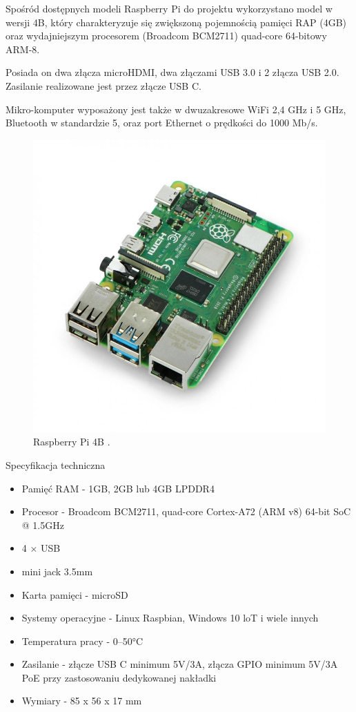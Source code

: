 \documentclass[a4paper,12pt,reqno]{article}
\begin{document}
Spośród dostępnych modeli Raspberry Pi do projektu wykorzystano model w wersji 4B, który charakteryzuje się zwiększoną pojemnością pamięci RAP (4GB) oraz wydajniejszym procesorem (Broadcom BCM2711) quad-core 64-bitowy ARM-8.

Posiada on dwa złącza microHDMI, dwa złączami USB 3.0 i 2 złącza USB 2.0. Zasilanie realizowane jest przez złącze USB C.

Mikro-komputer wyposażony jest także w dwuzakresowe WiFi 2,4 GHz i 5 GHz, Bluetooth w standardzie 5, oraz port Ethernet o prędkości do 1000 Mb/s.

\begin{figure}[H]%
\centering
\includegraphics[width=0.8\columnwidth]{imgs/raspberrypi4.jpg}
\caption{Raspberry Pi 4B \cite{img_rp4b}. \label{rp4b}}
\quad
\end{figure}

Specyfikacja techniczna

\begin{itemize}
	\item Pamięć RAM - 1GB, 2GB lub 4GB LPDDR4
	\item Procesor - Broadcom BCM2711, quad-core Cortex-A72 (ARM v8) 64-bit SoC @ 1.5GHz
	\item 4 × USB
	\item mini jack 3.5mm
	\item Karta pamięci - microSD
	\item Systemy operacyjne - Linux Raspbian, Windows 10 loT i wiele innych
	\item Temperatura pracy - 0–50°C
	\item Zasilanie - złącze USB C minimum 5V/3A, złącza GPIO minimum 5V/3A PoE przy zastosowaniu dedykowanej nakładki
	\item Wymiary - 85 x 56 x 17 mm
\end{itemize}
\end{document}

